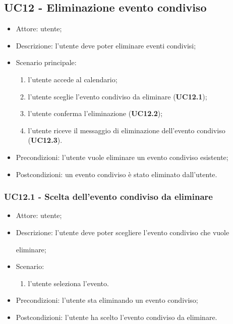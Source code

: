 \subsection{UC12 - Eliminazione evento condiviso}
\begin{itemize}
    \item Attore: utente;
    \item Descrizione: l'utente deve poter eliminare eventi condivisi;
    \item Scenario principale:
        \begin{enumerate}
        \item l'utente accede al calendario;
        \item l'utente sceglie l'evento condiviso da eliminare (\textbf{UC12.1});
        \item l'utente conferma l'eliminazione (\textbf{UC12.2});
        \item l'utente riceve il messaggio di eliminazione dell'evento condiviso (\textbf{UC12.3}).
        \end{enumerate}
    \item Precondizioni: l'utente vuole eliminare un evento condiviso esistente;
    \item Postcondizioni: un evento condiviso è stato eliminato dall'utente.
\end{itemize}

\subsubsection{UC12.1 - Scelta dell'evento condiviso da eliminare}
\begin{itemize}
    \item Attore: utente;
    \item Descrizione: l'utente deve poter scegliere l'evento condiviso che vuole \par eliminare;
    \item Scenario:
        \begin{enumerate}
        \item l'utente seleziona l'evento.
        \end{enumerate}
    
    \item Precondizioni: l'utente sta eliminando un evento condiviso;
    \item Postcondizioni: l'utente ha scelto l'evento condiviso da eliminare.
\end{itemize}


